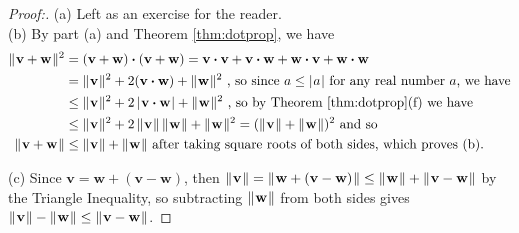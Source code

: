 \begin{proofbar}\begin{proof}[Proof:]
 (a) Left as an exercise for the reader.\smallskip\\(b) By part (a) and Theorem \ref{thm:dotprop}, we have
  \begin{align*}
   \lVert\mspace{1mu}\mathbf{v} + \mathbf{w}\mspace{1mu}\rVert^2 &= (\mathbf{v} + \mathbf{w}) \bm{\cdot} (\mathbf{v} + \mathbf{w})
   = \mathbf{v} \bm{\cdot} \mathbf{v} + \mathbf{v} \bm{\cdot} \mathbf{w} + \mathbf{w} \bm{\cdot} \mathbf{v} +
   \mathbf{w} \bm{\cdot} \mathbf{w}\\
   &= \lVert\mspace{1mu}\mathbf{v}\mspace{1mu}\rVert^2 + 2(\mathbf{v} \bm{\cdot} \mathbf{w}) + \lVert\mspace{1mu}\mathbf{w}\mspace{1mu}\rVert^2 \text{~, so since $a \le \lvert\mspace{1mu}a\mspace{1mu}\rvert$
    for any real number $a$, we have}\\
   &\le \lVert\mspace{1mu}\mathbf{v}\mspace{1mu}\rVert^2 + 2\,\lvert\mspace{1mu}\mathbf{v} \bm{\cdot} \mathbf{w}\mspace{1mu}\rvert + \lVert\mspace{1mu}\mathbf{w}\mspace{1mu}\rVert^2 
    \text{~, so by Theorem \ref{thm:dotprop}(f) we have}\\
   &\le \lVert\mspace{1mu}\mathbf{v}\mspace{1mu}\rVert^2 + 2\,\lVert\mspace{1mu}\mathbf{v}\mspace{1mu}\rVert\,\lVert\mspace{1mu}\mathbf{w}\mspace{1mu}\rVert + \lVert\mspace{1mu}\mathbf{w}\mspace{1mu}\rVert^2 =
    (\lVert\mspace{1mu}\mathbf{v}\mspace{1mu}\rVert + \lVert\mspace{1mu}\mathbf{w}\mspace{1mu}\rVert)^2 \text{~and so}\\
   \lVert\mspace{1mu}\mathbf{v} + \mathbf{w}\mspace{1mu}\rVert &\le \lVert\mspace{1mu}\mathbf{v}\mspace{1mu}\rVert + \lVert\mspace{1mu}\mathbf{w}\mspace{1mu}\rVert
    \text{~after taking square roots of both sides, which proves (b).}
  \end{align*}
  \par\noindent(c) Since $\mathbf{v} = \mathbf{w} + (\mathbf{v} - \mathbf{w})$, then $\lVert\mspace{1mu}\mathbf{v}\mspace{1mu}\rVert = 
  \lVert\mspace{1mu}\mathbf{w} + (\mathbf{v} - \mathbf{w})\mspace{1mu}\rVert \le \lVert\mspace{1mu}\mathbf{w}\mspace{1mu}\rVert + \lVert\mspace{1mu}\mathbf{v} - \mathbf{w}\mspace{1mu}\rVert$
  by the Triangle Inequality, so subtracting $\lVert\mspace{1mu}\mathbf{w}\mspace{1mu}\rVert$ from both sides gives
  $\lVert\mspace{1mu}\mathbf{v}\mspace{1mu}\rVert - \lVert\mspace{1mu}\mathbf{w}\mspace{1mu}\rVert \le \lVert\mspace{1mu}\mathbf{v} - \mathbf{w}\mspace{1mu}\rVert$. \qquad \qedhere 
\end{proof}\end{proofbar}

